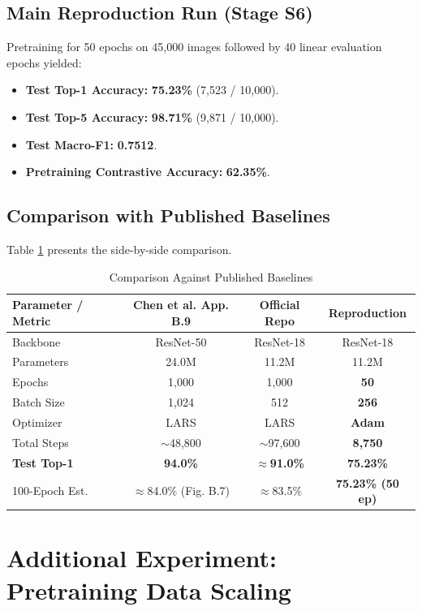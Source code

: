 \documentclass[conference]{IEEEtran}
\begin{document}
\subsection{Main Reproduction Run (Stage S6)}
Pretraining for 50 epochs on 45,000 images followed by 40 linear evaluation epochs yielded:
\begin{itemize}
    \item \textbf{Test Top-1 Accuracy:} \textbf{75.23\%} (7,523 / 10,000).
    \item \textbf{Test Top-5 Accuracy:} \textbf{98.71\%} (9,871 / 10,000).
    \item \textbf{Test Macro-F1:} \textbf{0.7512}.
    \item \textbf{Pretraining Contrastive Accuracy:} \textbf{62.35\%}.
\end{itemize}

\subsection{Comparison with Published Baselines}
Table \ref{tab:comp_main} presents the side-by-side comparison.

\begin{table}[htbp]
\caption{Comparison Against Published Baselines}
\label{tab:comp_main}
\centering
\small
\begin{tabular}{lccc}
\toprule
\textbf{Parameter / Metric} & \textbf{Chen et al. App. B.9} & \textbf{Official Repo} & \textbf{Reproduction} \\ \midrule
Backbone & ResNet-50 & ResNet-18 & ResNet-18 \\
Parameters & 24.0M & 11.2M & 11.2M \\
Epochs & 1,000 & 1,000 & \textbf{50} \\
Batch Size & 1,024 & 512 & \textbf{256} \\
Optimizer & LARS & LARS & \textbf{Adam} \\
Total Steps & $\sim$48,800 & $\sim$97,600 & \textbf{8,750} \\ \midrule
\textbf{Test Top-1} & \textbf{94.0\%} & \textbf{$\approx$91.0\%} & \textbf{75.23\%} \\
100-Epoch Est. & $\approx$84.0\% (Fig. B.7) & $\approx$83.5\% & \textbf{75.23\% (50 ep)} \\ \bottomrule
\end{tabular}
\end{table}

\section{Additional Experiment: Pretraining Data Scaling}
\end{document}
